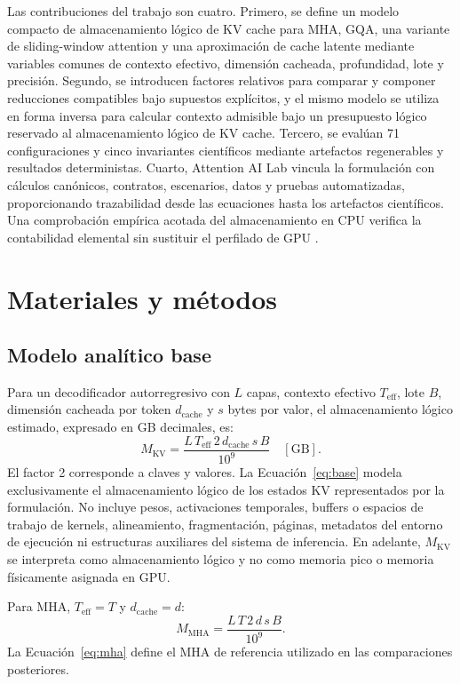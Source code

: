 \documentclass[a4paper,twocolumn]{article}
\begin{document}
Las contribuciones del trabajo son cuatro. Primero, se define un modelo compacto de almacenamiento lógico de KV cache para MHA, GQA, una variante de sliding-window attention y una aproximación de cache latente mediante variables comunes de contexto efectivo, dimensión cacheada, profundidad, lote y precisión. Segundo, se introducen factores relativos para comparar y componer reducciones compatibles bajo supuestos explícitos, y el mismo modelo se utiliza en forma inversa para calcular contexto admisible bajo un presupuesto lógico reservado al almacenamiento lógico de KV cache. Tercero, se evalúan 71 configuraciones y cinco invariantes científicos mediante artefactos regenerables y resultados deterministas. Cuarto, Attention AI Lab vincula la formulación con cálculos canónicos, contratos, escenarios, datos y pruebas automatizadas, proporcionando trazabilidad desde las ecuaciones hasta los artefactos científicos. Una comprobación empírica acotada del almacenamiento en CPU verifica la contabilidad elemental sin sustituir el perfilado de GPU \cite{lara2026attentionlab}.

\section{Materiales y métodos}
\subsection{Modelo analítico base}
Para un decodificador autorregresivo con $L$ capas, contexto efectivo $T_{\mathrm{eff}}$, lote $B$, dimensión cacheada por token $d_{\mathrm{cache}}$ y $s$ bytes por valor, el almacenamiento lógico estimado, expresado en GB decimales, es:
\begin{equation}\label{eq:base}
M_{\mathrm{KV}}=\frac{L\,T_{\mathrm{eff}}\,2\,d_{\mathrm{cache}}\,s\,B}{10^{9}}\quad [\mathrm{GB}].
\end{equation}
El factor 2 corresponde a claves y valores. La Ecuación~\eqref{eq:base} modela exclusivamente el almacenamiento lógico de los estados KV representados por la formulación. No incluye pesos, activaciones temporales, buffers o espacios de trabajo de kernels, alineamiento, fragmentación, páginas, metadatos del entorno de ejecución ni estructuras auxiliares del sistema de inferencia. En adelante, $M_{\mathrm{KV}}$ se interpreta como almacenamiento lógico y no como memoria pico o memoria físicamente asignada en GPU.

Para MHA, $T_{\mathrm{eff}}=T$ y $d_{\mathrm{cache}}=d$:
\begin{equation}\label{eq:mha}
M_{\mathrm{MHA}}=\frac{L\,T\,2\,d\,s\,B}{10^{9}}.
\end{equation}
La Ecuación~\eqref{eq:mha} define el MHA de referencia utilizado en las comparaciones posteriores.
\end{document}
